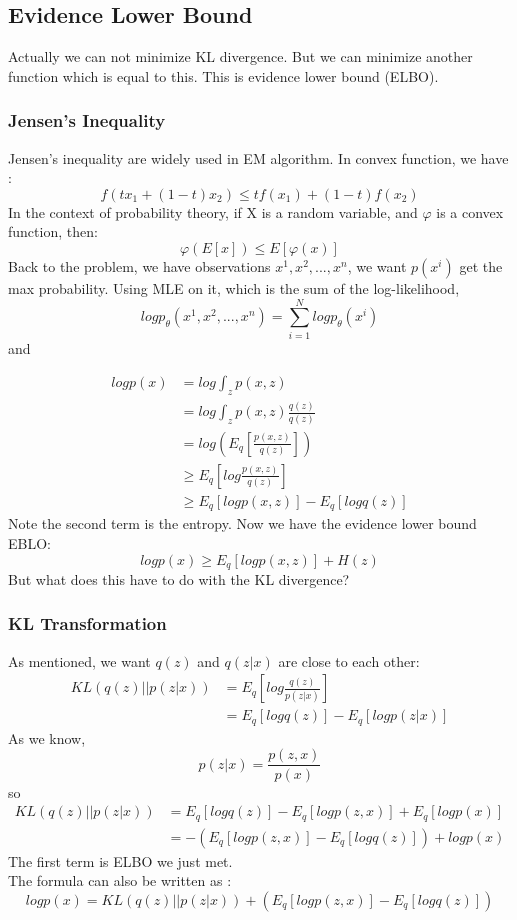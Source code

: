 \documentclass{article}
\begin{document}
\subsection{Evidence Lower Bound}
Actually we can not minimize KL divergence. But we can minimize another function which is equal to this. This is evidence lower bound (ELBO).
\subsubsection{Jensen's Inequality}
Jensen's inequality are widely used in EM algorithm. In convex function, we have :
$$f(tx_{1}+(1-t)x_{2})\leq tf(x_{1})+(1-t)f(x_{2}) $$ 
In the context of probability theory, if X is a random variable, and $\varphi$ is a convex function, then:
$$\varphi(E[x]) \leq E[\varphi(x)]$$
Back to the problem, we have observations $x^{1},x^{2},...,x^{n}$, we want $p(x^{i})$ get the max probability. Using MLE on it, which is the sum of the log-likelihood,
$$logp_{\theta}(x^{1},x^{2},...,x^{n})=\sum_{i=1}^{N}logp_{\theta} (x^{i})$$
and

\begin{align*}
logp(x) & =log \int_{z}p(x,z) \\
 &= log \int_{z}p(x,z)\frac{q(z)}{q(z)} \\
 &= log \left( E_{q} \left[ \frac{p(x,z)}{q(z)} \right] \right) \\
 &\geq E_{q} \left[ log \frac{p(x,z)}{q(z)} \right] \\
 &\geq E_{q}[logp(x,z)]-E_{q}[logq(z)]
\end{align*}
Note the second term is the entropy. Now we have the evidence lower bound EBLO:
$$log p(x) \geq E_{q}[logp(x,z)]+H(z)$$
But what does this have to do with the KL divergence? 
\subsubsection{KL Transformation}
As mentioned, we want $q(z)$ and $q(z|x)$ are close to each other:
\begin{align*}
KL(q(z)||p(z|x)) &= E_{q}\left[ log \frac{q(z)}{p(z|x)} \right] \\
&=E_{q}[logq(z)]-E_{q}[logp(z|x)]
\end{align*}
As we know,
$$p(z|x)=\frac{p(z,x)}{p(x)}$$
so 
\begin{align*}
KL(q(z)||p(z|x)) &= E_{q}[logq(z)]-E_{q}[logp(z,x)]+E_{q}[logp(x)] \\
&= -(E_{q}[logp(z,x)]-E_{q}[logq(z)])+logp(x)
\end{align*}
The first term is ELBO we just met.\\
The formula can also be written as :
$$logp(x)=KL(q(z)||p(z|x))+(E_{q}[logp(z,x)]-E_{q}[logq(z)])$$
\end{document}
